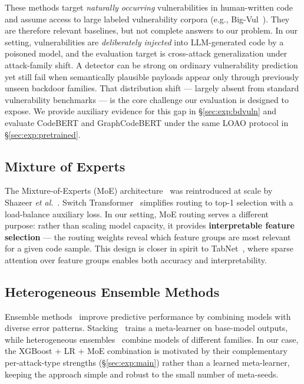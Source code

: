 ﻿\documentclass[sigconf,review,anonymous]{acmart}
\begin{document}
These methods target \emph{naturally occurring} vulnerabilities in human-written
code and assume access to large labeled vulnerability corpora (e.g.,
Big-Vul~\cite{fan2020bigvul}).
They are therefore relevant baselines, but not complete answers to our problem.
In our setting, vulnerabilities are \emph{deliberately injected} into
LLM-generated code by a poisoned model, and the evaluation target is
cross-attack generalization under attack-family shift. A detector can be strong
on ordinary vulnerability prediction yet still fail when semantically plausible
payloads appear only through previously unseen backdoor families. That
distribution shift --- largely absent from standard vulnerability benchmarks ---
is the core challenge our evaluation is designed to expose.
We provide auxiliary evidence for this gap in \S\ref{sec:exp:bdvuln}
and evaluate CodeBERT and GraphCodeBERT under the same LOAO protocol in
\S\ref{sec:exp:pretrained}.
\subsection{Mixture of Experts}

The Mixture-of-Experts (MoE) architecture~\cite{jacobs1991moe} was reintroduced
at scale by Shazeer \textit{et al.}~\cite{shazeer2017moe}.
Switch Transformer~\cite{fedus2022switch} simplifies routing to top-1 selection
with a load-balance auxiliary loss.
In our setting, MoE routing serves a different purpose: rather than scaling
model capacity, it provides \textbf{interpretable feature selection} --- the
routing weights reveal which feature groups are most relevant for a given code
sample.
This design is closer in spirit to TabNet~\cite{arik2021tabnet}, where sparse
attention over feature groups enables both accuracy and interpretability.

\subsection{Heterogeneous Ensemble Methods}

Ensemble methods~\cite{breiman1996bagging,dietterich2000ensemble} improve
predictive performance by combining models with diverse error patterns.
Stacking~\cite{wolpert1992stacking} trains a meta-learner on base-model outputs,
while heterogeneous ensembles~\cite{gomes2017survey} combine models of different
families.
In our case, the XGBoost + LR + MoE combination is motivated by their
complementary per-attack-type strengths (\S\ref{sec:exp:main}) rather than a
learned meta-learner, keeping the approach simple and robust to the small number
of meta-seeds.
\end{document}
